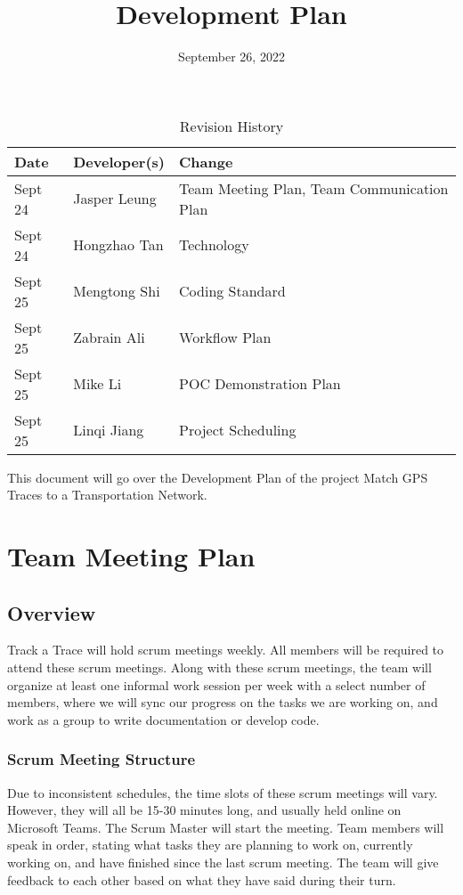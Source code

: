 \documentclass{article}
\title{Development Plan\\\progname}
\author{\authname}
\date{September 26, 2022}
\begin{document}
\begin{table}[hp]
\caption{Revision History} \label{TblRevisionHistory}
\begin{tabularx}{\textwidth}{llX}
\toprule
\textbf{Date} & \textbf{Developer(s)} & \textbf{Change}\\
\midrule
Sept 24 & Jasper Leung & Team Meeting Plan, Team Communication Plan\\
Sept 24 & Hongzhao Tan & Technology\\
Sept 25 & Mengtong Shi & Coding Standard\\
Sept 25 & Zabrain Ali & Workflow Plan\\
Sept 25 & Mike Li & POC Demonstration Plan\\
Sept 25 & Linqi Jiang & Project Scheduling\\
\bottomrule
\end{tabularx}
\end{table}

\newpage

\maketitle

This document will go over the Development Plan of the project Match GPS Traces to a Transportation Network.

\section{Team Meeting Plan}

\subsection{Overview}
Track a Trace will hold scrum meetings weekly. All members will be required to attend these scrum meetings. Along with these scrum meetings, the team will organize at least one informal work session per week with a select number of members, where we will sync our progress on the tasks we are working on, and work as a group to write documentation or develop code.

\subsubsection{Scrum Meeting Structure}
Due to inconsistent schedules, the time slots of these scrum meetings will vary. However, they will all be 15-30 minutes long, and usually held online on Microsoft Teams. The Scrum Master will start the meeting. Team members will speak in order, stating what tasks they are planning to work on, currently working on, and have finished since the last scrum meeting. The team will give feedback to each other based on what they have said during their turn.
\end{document}
